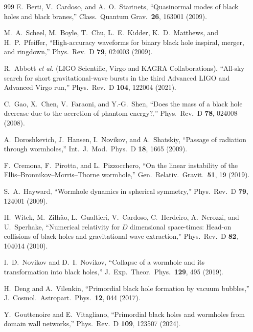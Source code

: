 \documentclass[twocolumn,floatfix,aps,prd,superscriptaddress,nofootinbib,showkeys]{revtex4-2}
\begin{document}
\begin{thebibliography}{999}
E.~Berti, V.~Cardoso, and A.~O.~Starinets,
\newblock ``Quasinormal modes of black holes and black branes,''
\newblock Class.\ Quantum Grav.\ \textbf{26}, 163001 (2009).

M.~A.~Scheel, M.~Boyle, T.~Chu, L.~E.~Kidder, K.~D.~Matthews, and H.~P.~Pfeiffer,
\newblock ``High-accuracy waveforms for binary black hole inspiral, merger, and ringdown,''
\newblock Phys.\ Rev.\ D \textbf{79}, 024003 (2009).

R.~Abbott \emph{et al.} (LIGO Scientific, Virgo and KAGRA Collaborations),
\newblock ``All-sky search for short gravitational-wave bursts in the third Advanced LIGO and Advanced Virgo run,''
\newblock Phys.\ Rev.\ D \textbf{104}, 122004 (2021).

C.~Gao, X.~Chen, V.~Faraoni, and Y.-G.~Shen,
\newblock ``Does the mass of a black hole decrease due to the accretion of phantom energy?,''
\newblock Phys.\ Rev.\ D \textbf{78}, 024008 (2008).

A.~Doroshkevich, J.~Hansen, I.~Novikov, and A.~Shatskiy,
\newblock ``Passage of radiation through wormholes,''
\newblock Int.\ J.\ Mod.\ Phys.\ D \textbf{18}, 1665 (2009).

F.~Cremona, F.~Pirotta, and L.~Pizzocchero,
\newblock ``On the linear instability of the Ellis--Bronnikov--Morris--Thorne wormhole,''
\newblock Gen.\ Relativ.\ Gravit.\ \textbf{51}, 19 (2019).

S.~A.~Hayward,
\newblock ``Wormhole dynamics in spherical symmetry,''
\newblock Phys.\ Rev.\ D \textbf{79}, 124001 (2009).

H.~Witek, M.~Zilh\~ao, L.~Gualtieri, V.~Cardoso, C.~Herdeiro, A.~Nerozzi, and U.~Sperhake,
\newblock ``Numerical relativity for $D$ dimensional space-times: Head-on collisions of black holes and gravitational wave extraction,''
\newblock Phys.\ Rev.\ D \textbf{82}, 104014 (2010).

I.~D.~Novikov and D.~I.~Novikov,
\newblock ``Collapse of a wormhole and its transformation into black holes,''
\newblock J.\ Exp.\ Theor.\ Phys.\ \textbf{129}, 495 (2019).

H.~Deng and A.~Vilenkin,
\newblock ``Primordial black hole formation by vacuum bubbles,''
\newblock J.\ Cosmol.\ Astropart.\ Phys.\ \textbf{12}, 044 (2017).

Y.~Gouttenoire and E.~Vitagliano,
\newblock ``Primordial black holes and wormholes from domain wall networks,''
\newblock Phys.\ Rev.\ D \textbf{109}, 123507 (2024).


\end{thebibliography}
\end{document}
